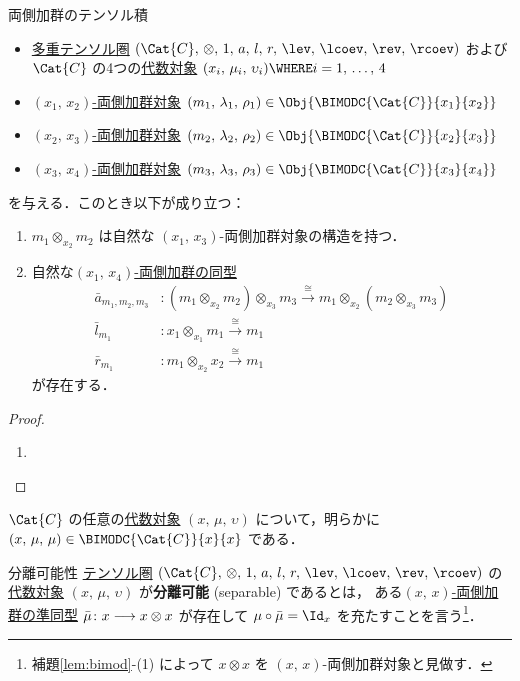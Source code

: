 \documentclass[TQFT_main]{subfiles}
\begin{document}
\begin{mylem}[label=lem:bimod]{両側加群のテンソル積}
    \begin{itemize}
        \item \hyperref[def:tensorfusion-cat]{多重テンソル圏} $(\Cat{C},\, \otimes,\, 1,\, a,\, l,\, r,\, \lev,\, \lcoev,\, \rev,\, \rcoev)$ 
        および $\Cat{C}$ の4つの\hyperref[def:algobj]{代数対象} $(x_i,\, \mu_i,\, \upsilon_i) \WHERE  i = 1,\, \dots,\, 4$
        \item \hyperref[def:bimodobj]{$(x_1,\, x_2)$-両側加群対象} $(m_1,\, \lambda_1,\, \rho_1) \in \Obj{\BIMODC{\Cat{C}}{x_1}{x_2}}$
        \item \hyperref[def:bimodobj]{$(x_2,\, x_3)$-両側加群対象} $(m_2,\, \lambda_2,\, \rho_2) \in \Obj{\BIMODC{\Cat{C}}{x_2}{x_3}}$
        \item \hyperref[def:bimodobj]{$(x_3,\, x_4)$-両側加群対象} $(m_3,\, \lambda_3,\, \rho_3) \in \Obj{\BIMODC{\Cat{C}}{x_3}{x_4}}$
    \end{itemize}
    を与える．このとき以下が成り立つ：
    \begin{enumerate}
        \item $m_1 \otimes_{x_2} m_2$ は自然な $(x_1,\, x_3)$-両側加群対象の構造を持つ．
        \item 自然な\hyperref[def:hom-bimod]{$(x_1,\, x_4)$-両側加群の同型}
        \begin{align}
            \bar{a}_{m_1,m_2,m_3} &\colon (m_1 \otimes_{x_2} m_2) \otimes_{x_3} m_3 \xrightarrow{\cong} m_1 \otimes_{x_2} (m_2 \otimes_{x_3} m_3) \\
            \bar{l}_{m_1} &\colon x_1 \otimes_{x_1} m_1 \xrightarrow{\cong} m_1 \\
            \bar{r}_{m_1} &\colon m_1 \otimes_{x_2} x_2 \xrightarrow{\cong} m_1
        \end{align}
        が存在する．
    \end{enumerate}
\end{mylem}

\begin{proof}
    \begin{enumerate}
        \item 
    \end{enumerate}
\end{proof}

$\Cat{C}$ の任意の\hyperref[def:algobj]{代数対象} $(x,\, \mu,\, \upsilon)$ について，明らかに $(x,\, \mu,\, \mu) \in \BIMODC{\Cat{C}}{x}{x}$ である．

\begin{mydef}[label=def:separable-alg]{分離可能性}
    \hyperref[def:tensorfusion-cat]{テンソル圏} $(\Cat{C},\, \otimes,\, 1,\, a,\, l,\, r,\, \lev,\, \lcoev,\, \rev,\, \rcoev)$ の\hyperref[def:algobj]{代数対象} $(x,\,\mu ,\,\upsilon)$ が\textbf{分離可能} (separable) であるとは，
    ある\hyperref[def:hom-bimod]{$(x,\, x)$-両側加群の準同型} $\bar{\mu} \colon x \longrightarrow x \otimes x$ が存在して $\mu \circ \bar{\mu} = \Id_x$ を充たすことを言う\footnote{補題\ref{lem:bimod}-(1) によって $x \otimes x$ を $(x,\, x)$-両側加群対象と見做す．}．
\end{mydef}
\end{document}
